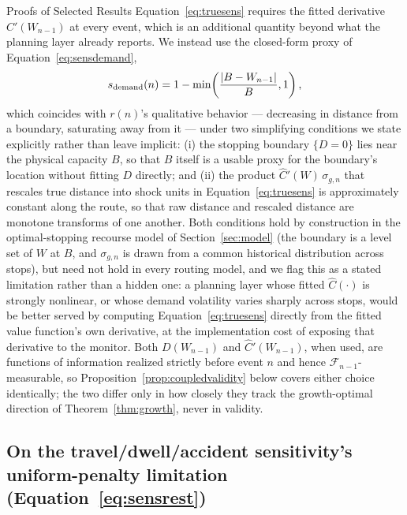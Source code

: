 \documentclass[trsc,dblanonrev]{informs4}
\newcommand{\F}{\mathcal{F}}
\begin{document}
\begin{APPENDIX}{Proofs of Selected Results}
Equation~\eqref{eq:truesens} requires the fitted derivative $\widehat
C'(W_{n-1})$ at every event, which is an additional quantity beyond
what the planning layer already reports. We instead use the
closed-form proxy of Equation~\eqref{eq:sensdemand},
\begin{equation}\notag
s_{\mathrm{demand}}(n) = 1 - \min\!\left(\frac{|B - W_{n-1}|}{B}, 1\right),
\end{equation}
which coincides with $r(n)$'s qualitative behavior --- decreasing in
distance from a boundary, saturating away from it --- under two
simplifying conditions we state explicitly rather than leave implicit:
(i) the stopping boundary $\{D = 0\}$ lies near the physical capacity
$B$, so that $B$ itself is a usable proxy for the boundary's location
without fitting $D$ directly; and (ii) the product $\widehat
C'(W)\,\sigma_{g,n}$ that rescales true distance into shock units in
Equation~\eqref{eq:truesens} is approximately constant along the route,
so that raw distance and rescaled distance are monotone transforms of
one another. Both conditions hold by construction in the
optimal-stopping recourse model of Section~\ref{sec:model} (the
boundary is a level set of $W$ at $B$, and $\sigma_{g,n}$ is drawn from
a common historical distribution across stops), but need not hold in
every routing model, and we flag this as a stated limitation rather
than a hidden one: a planning layer whose fitted $\widehat C(\cdot)$ is
strongly nonlinear, or whose demand volatility varies sharply across
stops, would be better served by computing Equation~\eqref{eq:truesens}
directly from the fitted value function's own derivative, at the
implementation cost of exposing that derivative to the monitor. Both
$D(W_{n-1})$ and $\widehat C'(W_{n-1})$, when used, are functions of
information realized strictly before event $n$ and hence
$\F_{n-1}$-measurable, so Proposition~\ref{prop:coupledvalidity} below
covers either choice identically; the two differ only in how closely
they track the growth-optimal direction of Theorem~\ref{thm:growth},
never in validity.

\subsection{On the travel/dwell/accident sensitivity's uniform-penalty limitation (Equation~\eqref{eq:sensrest})}


\end{APPENDIX}
\end{document}
